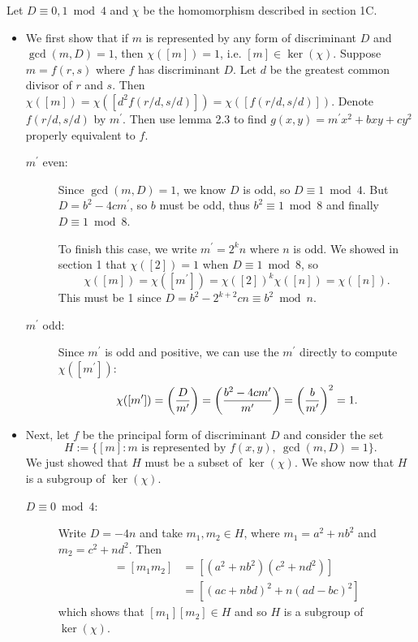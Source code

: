 Let $D\equiv 0,1\bmod 4$ and $\chi$ be the homomorphism described in section 1C.

\begin{itemize}
\item We first show that if $m$ is represented by any form of discriminant $D$ and $\gcd(m,D)=1$, then $\chi([m])=1$, i.e. $[m]\in\ker(\chi)$. Suppose $m=f(r,s)$ where $f$ has discriminant $D$. Let $d$ be the greatest common divisor of $r$ and $s$. Then $\chi([m])=\chi([d^2f(r/d, s/d)])=\chi([f(r/d, s/d)]).$ Denote $f(r/d, s/d)$ by $m^\prime$. Then use lemma 2.3 to find $g(x,y)=m^\prime x^2+bxy+cy^2$ properly equivalent to $f$.
\begin{description}
  \item [$m^\prime$ even:]
    Since $\gcd(m, D)=1$, we know $D$ is odd, so $D\equiv 1\bmod 4$. But $D=b^2-4cm^\prime$, so $b$ must be odd, thus $b^2\equiv 1\bmod 8$ and finally $D\equiv 1\bmod 8$.

    To finish this case, we write $m^\prime=2^kn$ where $n$ is odd. We showed in section 1 that $\chi([2])=1$ when $D\equiv 1\bmod 8$, so
    \[\chi([m])=\chi([m^\prime])=\chi([2])^k\chi([n])=\chi([n]).\]
    This must be 1 since $D=b^2-2^{k+2}cn\equiv b^2\bmod n$.

  \item [$m^\prime$ odd:]
    Since $m^\prime$ is odd and positive, we can use the $m^\prime$ directly to compute $\chi([m^\prime])$:
    \[\chi([m^\prime])=\left(\frac{D}{m^\prime}\right)=\left(\frac{b^2-4cm^\prime}{m^\prime}\right)=\left(\frac{b}{m^\prime}\right)^2=1.\]
\end{description}

\item Next, let $f$ be the principal form of discriminant $D$ and consider the set
\[H:=\{[m]: m\text{ is represented by }f(x,y),\ \gcd(m, D)=1\}.\]
We just showed that $H$ must be a subset of $\ker(\chi)$. We show now that $H$ is a subgroup of $\ker(\chi)$.
\begin{description}
  \item [$D\equiv 0\bmod 4$:]
  Write $D=-4n$ and take $m_1, m_2\in H$, where $m_1=a^2+nb^2$ and $m_2=c^2+nd^2$. Then
  \begin{align*}
  [m_1][m_2]=[m_1m_2]&=[(a^2+nb^2)(c^2+nd^2)]\\
                     &=[(ac+nbd)^2+n(ad-bc)^2]
  \end{align*}
  which shows that $[m_1][m_2]\in H$ and so $H$ is a subgroup of $\ker(\chi)$.


\end{description}
\end{itemize}

